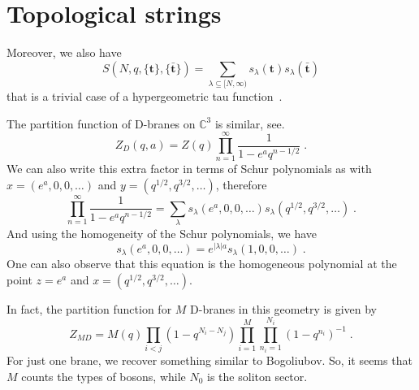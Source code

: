 \section{Topological strings}

Moreover, we also have 
\begin{equation}
 S(N, q, \{\bm{t}\}, \{\bar{\bm{t}}\}) 
 = \sum_{\lambda \subseteq [N, \infty)} s_\lambda(\bm{t})  s_\lambda(\bar{\bm{t}}) 
\end{equation}
that is a trivial case of a hypergeometric tau function~\cite{orlov:2001}. 

The partition function of D-branes on \(\mathbb{C}^3\)
is similar, see\cite{Saulina:2004da}. 
\begin{equation}
  Z_D(q, a) = Z(q) \prod_{n=1}^\infty \frac{1}{1- e^a q^{n - 1/2}}\; .
\end{equation}
We  can also write this extra factor in terms of Schur polynomials as
with \(x= (e^a, 0, 0, \dots)\) and \(y = (q^{1/2}, q^{3/2}, \dots)\),
therefore
\begin{equation}
\prod_{n=1}^\infty \frac{1}{1- e^a q^{n - 1/2}} = \sum_\lambda s_{\lambda}(e^a, 0, 0, \dots)
s_{\lambda}(q^{1/2}, q^{3/2}, \dots)\; .
\end{equation}
And using the homogeneity of the Schur polynomials, we have
\begin{equation}
s_{\lambda}(e^a, 0, 0, \dots) = e^{|\lambda|a} s_{\lambda}(1, 0, 0, \dots)\; . 
\end{equation}
One can also observe that this equation is the homogeneous polynomial at the point
\(z = e^a\) and \(x=(q^{1/2}, q^{3/2}, \dots)\).

In fact, the partition function for \(M\) D-branes in this geometry is given by 
\begin{equation}
Z_{MD} = M(q) \prod_{i<j}(1 - q^{N_i - N_j}) \prod_{i=1}^M \prod_{n_i=1}^{N_i} (1 - q^{n_i})^{-1}\; .
\end{equation}
For just one brane, we recover something similar to Bogoliubov. So, it seems
that \(M\) counts the types of bosons, while \(N_0\) is the soliton sector. 

